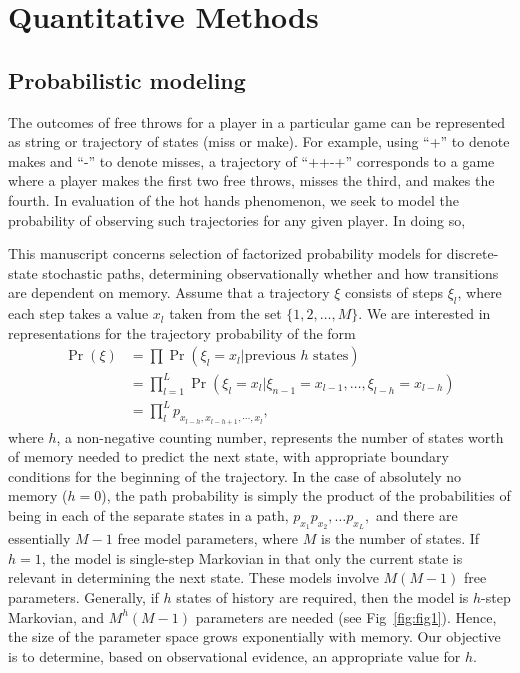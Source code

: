 \documentclass{IOS-Book-Article}
\begin{document}
\section{Quantitative Methods}

\subsection{Probabilistic modeling}

The outcomes of free throws for a player in a particular game can be  represented as string or trajectory of
states (miss or make). For example, using ``+'' to denote makes and ``-'' to denote misses, a trajectory of ``++-+'' corresponds
to a game where a player makes the first two free throws, misses the third, and makes the fourth.
In evaluation of the hot hands phenomenon, we seek to model the probability of observing such trajectories
for any given player. In doing so, 


This manuscript concerns selection of factorized probability models for discrete-state stochastic paths, determining observationally whether and how transitions  are  dependent on memory. Assume that a trajectory $\xi$ consists of steps $\xi_l$, where each step takes  a value $x_l$ taken from the set $\{1,2,\ldots,M\}.$ We are interested in representations for the trajectory probability of the  form
\begin{align}
\Pr(\xi) &=\prod \Pr\left( \xi_l = x_l  | \textrm{previous $h$ states} \right) \nonumber\\
&=\prod_{l=1}^L \Pr(\xi_l = x_l | \xi_{n-1} = x_{l-1}, \ldots, \xi_{l-h} = x_{l-h} )  \nonumber\\
&= \prod_{l}^L p_{x_{l-h},x_{l-h+1},\cdots,x_l}, 
\label{eq:factorize}
\end{align}
%
%
where $h$, a non-negative counting number, represents the number of states worth of memory needed to predict the next state, with appropriate boundary conditions for the beginning of the trajectory. In the case of absolutely no memory ($h=0$), the path probability is simply the product of the probabilities of being in each of the separate states in a path, $p_{x_1}p_{x_2},\ldots p_{x_L},$ and there are essentially $M-1$ free model parameters, where $M$ is the number of states. If $h=1$, the model is single-step Markovian in that only the current state is relevant in determining the next state. These models involve $M(M-1)$ free parameters. Generally, if $h$ states of history are required, then the model is $h$-step Markovian, and $M^h(M-1)$ parameters are needed (see Fig~\ref{fig:fig1}). Hence, the size of the parameter space grows exponentially with memory. Our objective is to determine, based on observational evidence, an appropriate value for $h$. 
\end{document}
